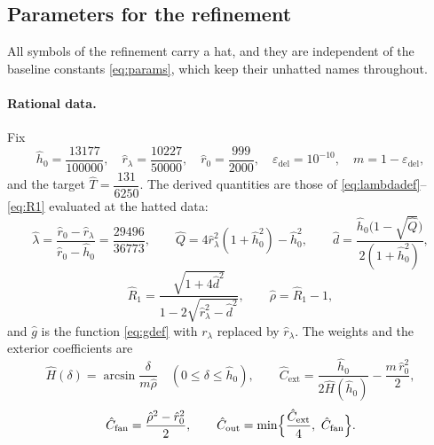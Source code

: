 \documentclass[11pt]{article}
\theoremstyle{plain}
\theoremstyle{definition}
\theoremstyle{remark}
\newcommand{\epsdel}{\varepsilon_{\mathrm{del}}}
\begin{document}
\subsection{Parameters for the refinement}\label{sec:annparameters}

All symbols of the refinement carry a hat, and they are independent of the
baseline constants \eqref{eq:params}, which keep their unhatted names
throughout.

\paragraph{Rational data.} Fix
\begin{equation}\label{eq:annparams}
  \hat h_{0}=\frac{13177}{100000},\quad
  \hat r_{\lambda}=\frac{10227}{50000},\quad
  \hat r_{0}=\frac{999}{2000},\quad
  \epsdel=10^{-10},\quad m=1-\epsdel,
\end{equation}
and the target $\hat T=\dfrac{131}{6250}$. The derived quantities are those of
\eqref{eq:lambdadef}--\eqref{eq:R1} evaluated at the hatted data:
\begin{equation}\label{eq:annderived}
  \hat\lambda=\frac{\hat r_{0}-\hat r_{\lambda}}{\hat r_{0}-\hat h_{0}}
  =\frac{29496}{36773},
  \qquad
  \hat Q=4\hat r_{\lambda}^{2}(1+\hat h_{0}^{2})-\hat h_{0}^{2},
  \qquad
  \hat d=\frac{\hat h_{0}\bigl(1-\sqrt{\hat Q}\bigr)}{2(1+\hat h_{0}^{2})},
\end{equation}
\begin{equation}\label{eq:annR1}
  \hat R_{1}=\frac{\sqrt{1+4\hat d^{2}}}{1-2\sqrt{\hat r_{\lambda}^{2}-\hat d^{2}}},
  \qquad
  \hat\rho=\hat R_{1}-1 ,
\end{equation}
and $\hat g$ is the function \eqref{eq:gdef} with $r_{\lambda}$ replaced by
$\hat r_{\lambda}$. The weights and the exterior coefficients are
\begin{equation}\label{eq:annweights}
  \hat H(\delta)=\arcsin\frac{\delta}{m\hat\rho}\quad(0\le\delta\le\hat h_{0}),
  \qquad
  \hat C_{\mathrm{ext}}=\frac{\hat h_{0}}{2\hat H(\hat h_{0})}
    -\frac{m\,\hat r_{0}^{2}}{2},
\end{equation}
\begin{equation}\label{eq:annCout}
  \hat C_{\mathrm{fan}}=\frac{\hat\rho^{2}-\hat r_{0}^{2}}{2},
  \qquad
  \hat C_{\mathrm{out}}
  =\min\Bigl\{\frac{\hat C_{\mathrm{ext}}}{4},\ \hat C_{\mathrm{fan}}\Bigr\}.
\end{equation}
\end{document}
